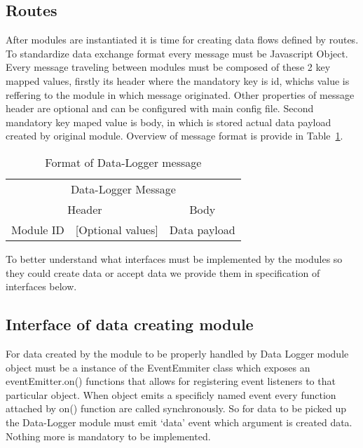 \subsection{Routes} %
\label{sub:routes}
After modules are instantiated it is time for creating data flows defined by routes. To standardize data exchange format every message must be Javascript Object. Every message traveling between modules must be composed of these 2 key mapped values, firstly its header where the mandatory key is id, whichs value is reffering to the module in which message originated. Other properties of message header are optional and can be configured with main config file. Second mandatory key maped value is body, in which is stored actual data payload created by original module. Overview of message format is provide in Table~\ref{tab:tab7}.
\begin{table}[H]
 \begin{center}
   \begin{tabular}{l l l l}
   \toprule
   \multicolumn{4}{c}{Data-Logger Message}\\
   \multicolumn{2}{c}{Header} & \multicolumn{2}{c}{Body} \\
   \midrule
   Module ID & [Optional values] & \multicolumn{2}{c}{Data payload}\\   
   \end{tabular}
 \end{center}
 \caption{Format of Data-Logger message}
 \label{tab:tab7}
\end{table}
To better understand what interfaces must be implemented by the modules so they could create data or accept data we provide them in specification of interfaces below.
\subsection{Interface of data creating module} %
\label{ssub:interface_of_data_creating_module}
For data created by the module to be properly handled by Data Logger module object must be a instance of the EventEmmiter class which exposes an eventEmitter.on() functions that allows for registering event listeners to that particular object. When object emits a specificly named event every function attached by on() function are called synchronously. So for data to be picked up the Data-Logger module must emit `data' event which argument is created data. Nothing more is mandatory to be implemented.


